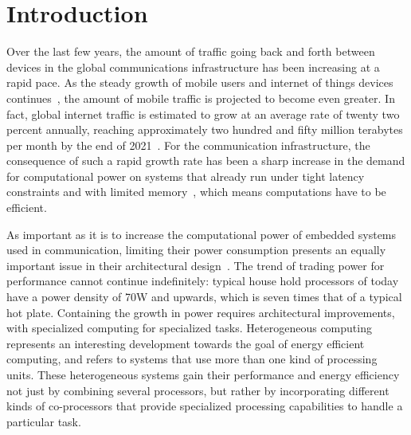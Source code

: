 

%
%

\chapter{Introduction}

Over the last few years, the amount of traffic going back and forth between devices in the global communications infrastructure has been increasing at a rapid pace. As the steady growth of mobile users and internet of things devices continues~\cite{ericsson2016}, the amount of mobile traffic is projected to become even greater. In fact, global internet traffic is estimated to grow at an average rate of twenty two percent annually, reaching approximately two hundred and fifty million terabytes per month by the end of 2021~\cite{cisco2016}. For the communication infrastructure, the consequence of such a rapid growth rate has been a sharp increase in the demand for computational power on systems that already run under tight latency constraints and with limited memory~\cite{persson2014}, which means computations have to be efficient.

As important as it is to increase the computational power of embedded systems used in communication, limiting their power consumption presents an equally important issue in their architectural design~\cite{mudge2001}. The trend of trading power for performance cannot continue indefinitely: typical house hold processors of today have a power density of 70W and upwards, which is seven times that of a typical hot plate. Containing the growth in power requires architectural improvements, with specialized computing for specialized tasks. Heterogeneous computing represents an interesting development towards the goal of energy efficient computing, and refers to systems that use more than one kind of processing units. These heterogeneous systems gain their performance and energy efficiency not just by combining several processors, but rather by incorporating different kinds of co-processors that provide specialized processing capabilities to handle a particular task.

